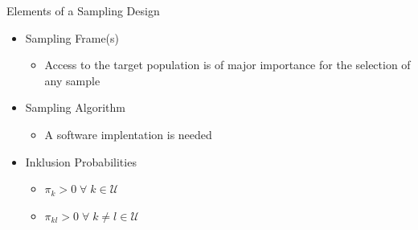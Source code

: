 \documentclass{beamer}\usepackage[]{graphicx}\usepackage[]{color}
\begin{document}
\begin{frame}{Elements of a Sampling Design}
\begin{itemize}
\item<1-> Sampling Frame(s)
 \begin{itemize}
  \item<1-> Access to the target population is of major importance for the selection of any sample
  \end{itemize}
\item<2-> Sampling Algorithm 
 \begin{itemize}
  \item<2-> A software implentation is needed
 \end{itemize}
\item<3-> Inklusion Probabilities
 \begin{itemize}
   \item<3-> $\pi_{k}>0   \; \forall\; k \in \mathcal{U}$
   \item<3-> $\pi_{kl}>0  \; \forall\; k \neq l \in \mathcal{U}$
 \end{itemize}
\end{itemize}
\end{frame}
\end{document}
